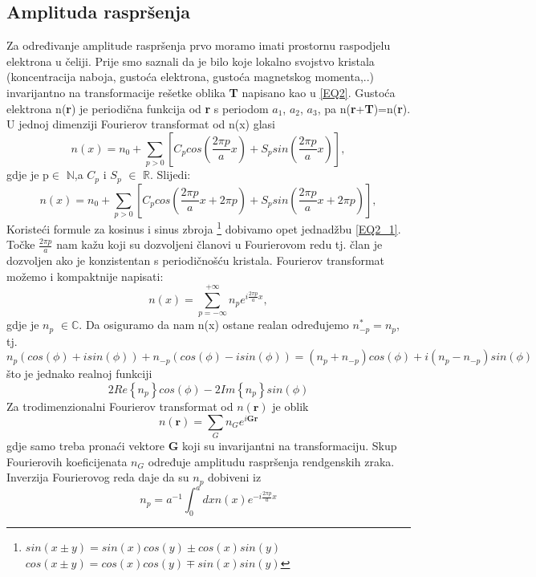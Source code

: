 \documentclass{article}
\numberwithin{equation}{section}
\begin{document}
\subsection{Amplituda raspršenja}
Za određivanje amplitude raspršenja prvo moramo imati prostornu raspodjelu elektrona u čeliji. Prije smo saznali da je bilo koje lokalno svojstvo kristala (koncentracija naboja, gustoća elektrona, gustoća magnetskog momenta,..) invarijantno na transformacije rešetke oblika \textbf{T} napisano kao u \ref{EQ2}. Gustoća elektrona n(\textbf{r}) je periodična funkcija od \textbf{r} s periodom \textbf{$a_1$}, \textbf{$a_2$}, \textbf{$a_3$}, pa n(\textbf{r}+\textbf{T})=n(\textbf{r}). U jednoj dimenziji Fourierov transformat od n(x) glasi 
\begin{equation}
    n(x)= n_0 + \sum_{p>0}\left[ C_p cos\left(\frac{2\pi p}{a}x\right)+ S_p sin\left(\frac{2\pi p}{a}x\right)\right],
    \label{EQ2_1}
\end{equation}
gdje je p$\in$ $\mathbb{N}$,a $ C_p$ i $S_p$ $\in$ $\mathbb{R}$. Slijedi: 
\begin{equation}
    n(x)= n_0 + \sum_{p>0}\left[ C_p cos\left(\frac{2\pi p}{a}x + 2\pi p \right)+ S_p sin\left(\frac{2\pi p}{a}x + 2\pi p\right)\right],
    \label{EQ2_2}
\end{equation}
Koristeći formule za kosinus i sinus zbroja \footnote{$sin(x \pm y)= sin(x) cos(y) \pm cos(x) sin(y)$ \\ $cos(x\pm y)= cos(x) cos(y) \mp sin(x) sin(y)$} dobivamo opet jednadžbu \ref{EQ2_1}.\\ Točke $\frac{2\pi p}{a}$ nam kažu koji su dozvoljeni članovi u Fourierovom redu tj. član je dozvoljen ako je konzistentan s periodičnošću kristala.  Fourierov transformat možemo i kompaktnije napisati: 
\begin{equation}
n(x)=\sum_{p=-\infty}^{+\infty}n_p e^{i \frac{2\pi p}{a}x},
    \label{EQ2_3}
\end{equation}
gdje je $n_p$ $\in \mathbb{C}$. Da osiguramo da nam n(x) ostane realan određujemo $n_{-p}^*=n_p$, tj. 
\begin{equation}
n_p\left(cos(\phi) + isin(\phi)\right)+ n_{-p}\left( cos(\phi) - isin(\phi)\right) = \left(n_p + n_{-p}\right)cos(\phi)+ i\left(n_p-n_{-p} \right) sin(\phi)
    \label{EQ2_4}
\end{equation} 
što je jednako realnoj funkciji 
\begin{equation}
2Re\left\{ n_p \right\} cos(\phi) - 2Im\left\{ n_p\right\}sin(\phi)
    \label{EQ2_5}
\end{equation}
   Za trodimenzionalni Fourierov transformat od $n(\textbf{r})$ je oblik 
   \begin{equation}
       n(\textbf{r})=\sum_G n_G e^{i \textbf{G}\textbf{r}}
       \label{EQ2_6}
   \end{equation}
   gdje samo treba pronaći vektore \textbf{G} koji su invarijantni na transformaciju.
   Skup Fourierovih koeficijenata $n_G$ određuje amplitudu raspršenja rendgenskih zraka. \\
   Inverzija Fourierovog reda daje da su $n_p$ dobiveni iz 
   \begin{equation}
       n_p=a^{-1}\int_0 ^a dx n(x)e^{-i\frac{2\pi p}{a}x}
       \label{EQ2_7}
   \end{equation}
\end{document}
